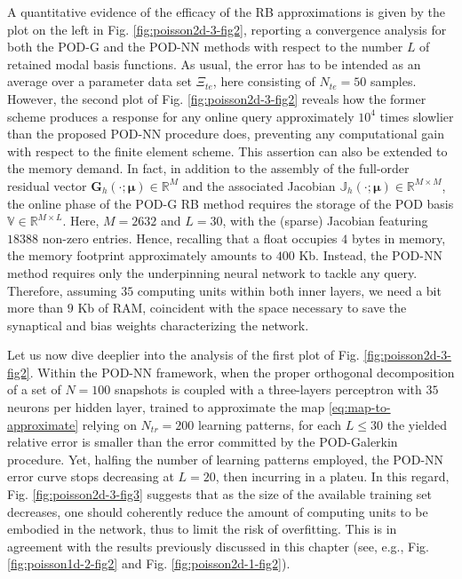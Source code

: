 \documentclass[12pt, a4paper, twoside, openright, notitlepage]{report}
\numberwithin{equation}{chapter}
\theoremstyle{theorem}
\theoremstyle{definition}
\theoremstyle{remark}
\theoremstyle{proposition}
\numberwithin{figure}{chapter}
\newcommand{\bg}[1]{\boldsymbol{#1}}
\begin{document}
		A quantitative evidence of the efficacy of the RB approximations is given by the plot on the left in Fig. \ref{fig:poisson2d-3-fig2}, reporting a convergence analysis for both the POD-G and the POD-NN methods with respect to the number $L$ of retained modal basis functions. As usual, the error has to be intended as an average over a parameter data set $\Xi_{te}$, here consisting of $N_{te} = 50$ samples. However, the second plot of Fig. \ref{fig:poisson2d-3-fig2} reveals how the former scheme produces a response for any online query approximately $10^4$ times slowlier than the proposed POD-NN procedure does, preventing any computational gain with respect to the finite element scheme. This assertion can also be extended to the memory demand. In fact, in addition to the assembly of the full-order residual vector $\mathbf{G}_h(\cdot;\bg{\mu}) \in \mathbb{R}^M$ and the associated Jacobian $\mathbb{J}_h(\cdot;\bg{\mu}) \in \mathbb{R}^{M \times M}$, the online phase of the POD-G RB method requires the storage of the POD basis $\mathbb{V} \in \mathbb{R}^{M \times L}$. Here, $M = 2632$ and $L = 30$, with the (sparse) Jacobian featuring $18388$ non-zero entries. Hence, recalling that a float occupies $4$ bytes in memory, the memory footprint approximately amounts to $400$ Kb. Instead, the POD-NN method requires only the underpinning neural network to tackle any query. Therefore, assuming $35$ computing units within both inner layers, we need a bit more than $9$ Kb of RAM, coincident with the space necessary to save the synaptical and bias weights characterizing the network.
		
		Let us now dive deeplier into the analysis of the first plot of Fig. \ref{fig:poisson2d-3-fig2}. Within the POD-NN framework, when the proper orthogonal decomposition of a set of $N = 100$ snapshots is coupled with a three-layers perceptron with $35$ neurons per hidden layer, trained to approximate the map \eqref{eq:map-to-approximate} relying on $N_{tr} = 200$ learning patterns, for each $L \leq 30$ the yielded relative error is smaller than the error committed by the POD-Galerkin procedure. Yet, halfing the number of learning patterns employed, the POD-NN error curve stops decreasing at $L = 20$, then incurring in a plateu. In this regard, Fig. \ref{fig:poisson2d-3-fig3} suggests that as the size of the available training set decreases, one should coherently reduce the amount of computing units to be embodied in the network, thus to limit the risk of overfitting. This is in agreement with the results previously discussed in this chapter (see, e.g., Fig. \ref{fig:poisson1d-2-fig2} and Fig. \ref{fig:poisson2d-1-fig2}).
						
\end{document}
